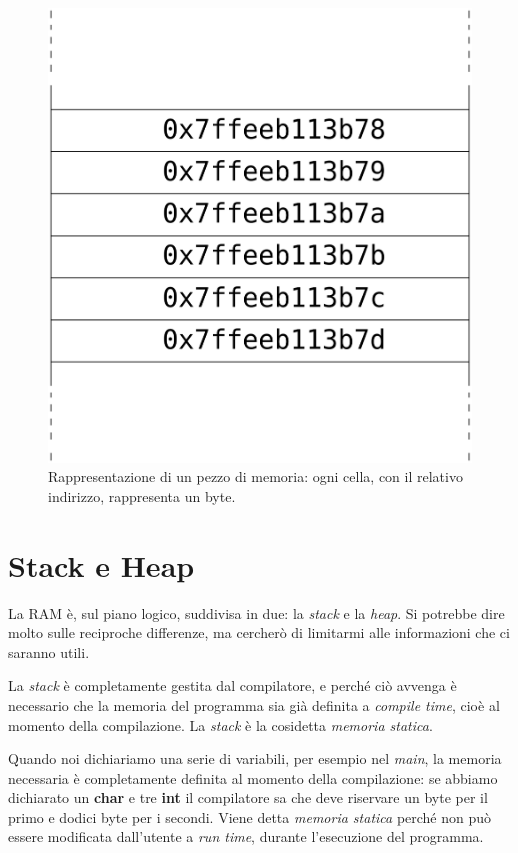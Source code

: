 \begin{figure} [ht]
	\centering
	\includegraphics[scale=0.3]{Immagini/memory.pdf}  
	\captionsetup{justification=centering,margin=2cm}
	\caption{Rappresentazione di un pezzo di memoria: ogni cella, con il relativo indirizzo, rappresenta un byte\protect\footnotemark.}
	\label{memory1}
\end{figure}
	\section{Stack e Heap}\label{stackheap}
	La RAM è, sul piano logico, suddivisa in due: la \emph{stack} e la \emph{heap}. Si potrebbe dire molto sulle reciproche differenze, ma cercherò di limitarmi alle informazioni che ci saranno utili. 
	
	La \emph{stack} è completamente gestita dal compilatore, e perché ciò avvenga è necessario che la memoria del programma sia già definita a \emph{compile time}, cioè al momento della compilazione. La \emph{stack} è la cosidetta \emph{memoria statica}. 
	
	Quando noi dichiariamo una serie di variabili, per esempio nel \emph{main}, la memoria necessaria è completamente definita al momento della compilazione: se abbiamo dichiarato un \textbf{char} e tre \textbf{int} il compilatore sa che deve riservare un byte per il primo e dodici byte per i secondi. Viene detta \emph{memoria statica} perché non può essere modificata dall'utente a \emph{run time}, durante l'esecuzione del programma. 
	
